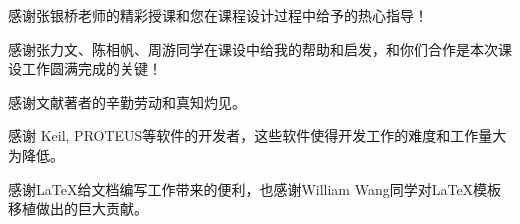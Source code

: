 
\begin{thanks}
  感谢张银桥老师的精彩授课和您在课程设计过程中给予的热心指导！
  
  感谢张力文、陈相帆、周游同学在课设中给我的帮助和启发，和你们合作是本次课设工作圆满完成的关键！
  
  感谢文献\cite{mcu,mcu1,mcu2,mcu3,mcu4}著者的辛勤劳动和真知灼见。
  
  感谢 Keil, PROTEUS等软件的开发者，这些软件使得开发工作的难度和工作量大为降低。

  感谢\LaTeX 给文档编写工作带来的便利，也感谢William Wang同学对\LaTeX 模板移植做出的巨大贡献。

\end{thanks}
\label{chap:thanks}